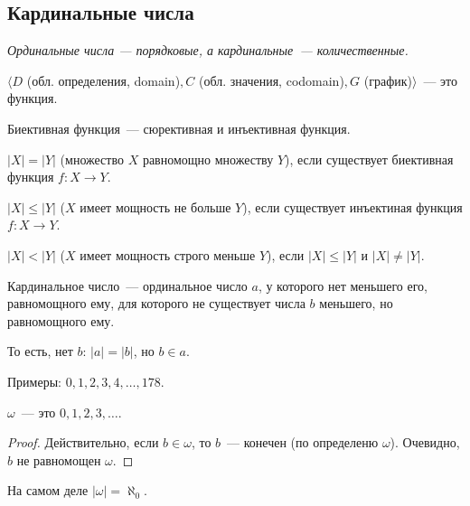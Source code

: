 \subsection{Кардинальные числа}
\textit{Ординальные числа --- порядковые, а кардинальные~--- количественные.}
\begin{definition}
    $\langle D$ (обл. определения, domain)$, C$ (обл. значения, codomain)$, G$ (график)$\rangle$~--- это функция.
\end{definition}

\begin{definition}
    Биективная функция~--- сюрективная и инъективная функция.
\end{definition}

\begin{definition}
    $|X| = |Y|$ (множество $X$ равномощно множеству $Y$), если существует биективная функция $f: X \to Y$.
\end{definition}

\begin{definition}
    $|X| \leqslant |Y|$ ($X$ имеет мощность не больше $Y$), если существует инъектиная функция $f: X\to Y$.
\end{definition}

\begin{definition}
    $|X| < |Y|$ ($X$ имеет мощность строго меньше $Y$), если $|X| \leqslant |Y|$ и $|X| \neq |Y|$.
\end{definition}

\begin{definition}
    Кардинальное число~--- ординальное число $a$, у которого нет меньшего его, равномощного ему, для которого не существует числа $b$ меньшего, но равномощного ему.

    То есть, нет $b$: $|a| = |b|$, но $b \in a$.
\end{definition}

\begin{example}
    Примеры: $0, 1, 2, 3, 4, \dots, 178$.
\end{example}

\begin{statement}
    $\omega$~--- это $0, 1, 2, 3, \dots$.
\end{statement}
\begin{proof}
    Действительно, если $b \in \omega$, то $b$~--- конечен (по определеню $\omega$).
    Очевидно, $b$ не равномощен $\omega$.
\end{proof}

\begin{definition}
    На самом деле $|\omega| = \aleph_0$.
\end{definition}

